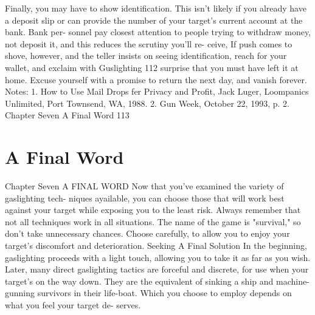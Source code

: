 \documentclass{book}
\begin{document}
Finally, you may have to show identification. This isn't 
likely if you already have a deposit slip or can provide the 
number of your target's current account at the bank. Bank per- 
sonnel pay closest attention to people trying to withdraw 
money, not deposit it, and this reduces the scrutiny you'll re- 
ceive, 
If push comes to shove, however, and the teller insists on 
seeing identification, reach for your wallet, and exclaim with  Guslighting 
112 
surprise that you must have left it at home. Excuse yourself 
with a promise to return the next day, and vanish forever. 
Notes: 
1. How to Use Mail Drops fer Privacy and Profit, Jack Luger, 
Loompanics Unlimited, Port Townsend, WA, 1988. 
2. Gun Week, October 22, 1993, p. 2. 
Chapter Seven 
A Final Word 
113 
\chapter{A Final Word}
Chapter Seven 
A FINAL WORD 
Now that you've examined the variety of gaslighting tech- 
niques ayailable, you can choose those that will work best 
against your target while exposing you to the least risk. Always 
remember that not all techniques work in all situations. The 
name of the game is "survival," so don't take unnecessary 
chances. Choose carefully, to allow you to enjoy your target's 
discomfort and deterioration. 
Seeking A Final Solution 
In the beginning, gaslighting proceeds with a light touch, 
allowing you to take it as far as you wish. Later, many direct 
gaslighting tactics are forceful and discrete, for use when your 
target's on the way down. They are the equivalent of sinking a 
ship and machine-gunning survivors in their life-boat. Which 
you choose to employ depends on what you feel your target de- 
serves.
\end{document}
